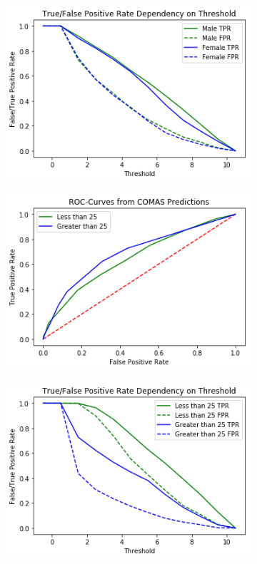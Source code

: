 \documentclass[11pt, fleqn, titlepage]{article}
\begin{document}
\begin{figure}[H]
\begin{subfigure}{0.5\textwidth}
		\end{subfigure}%
		\begin{subfigure}{0.5\textwidth}
			\centering
			\includegraphics[width=0.9\linewidth]{imgs/propub_fpr_tpr_sex.png}
		\end{subfigure}
		\begin{subfigure}{0.5\textwidth}
			\centering
			\includegraphics[width=0.9\linewidth]{imgs/propub_ROC_age.png}
		\end{subfigure}%
		\begin{subfigure}{0.5\textwidth}
			\centering
			\includegraphics[width=0.9\linewidth]{imgs/propub_fpr_tpr_age.png}

\end{subfigure}
\end{figure}
\end{document}

